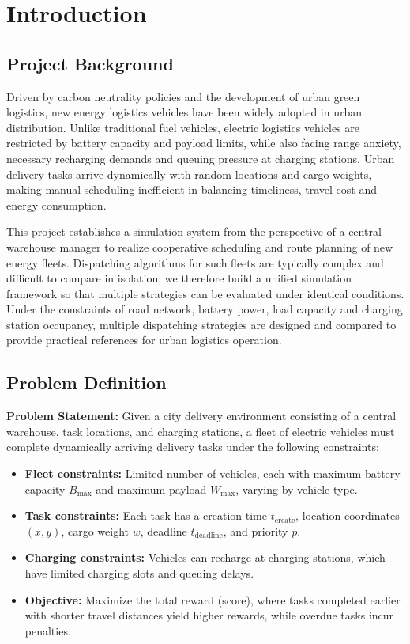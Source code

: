 
\chapter{Introduction}

\section{Project Background}

Driven by carbon neutrality policies and the development of urban green logistics, new energy logistics vehicles have been widely adopted in urban distribution. Unlike traditional fuel vehicles, electric logistics vehicles are restricted by battery capacity
and payload limits, while also facing range anxiety, necessary recharging demands and queuing pressure at charging stations. Urban delivery tasks arrive dynamically with random locations and cargo weights, making manual scheduling inefficient in balancing timeliness, travel cost and energy consumption.

This project establishes a simulation system from the perspective of a central warehouse manager to realize cooperative scheduling and route planning of new energy fleets. Dispatching algorithms for such fleets are typically complex and difficult to compare in isolation; we therefore build a unified simulation framework so that multiple strategies can be evaluated under identical conditions. Under the constraints of road network, battery power, load capacity and charging station occupancy, multiple dispatching strategies are designed and compared to provide practical references for urban logistics operation.

\section{Problem Definition}

\textbf{Problem Statement:} Given a city delivery environment consisting of a central warehouse, task locations, and charging stations, a fleet of electric vehicles must complete dynamically arriving delivery tasks under the following constraints:

\begin{itemize}[leftmargin=4em]
    \item \textbf{Fleet constraints:} Limited number of vehicles, each with maximum battery capacity $B_{\max}$ and maximum payload $W_{\max}$, varying by vehicle type.
    \item \textbf{Task constraints:} Each task has a creation time $t_{\text{create}}$, location coordinates $(x,y)$, cargo weight $w$, deadline $t_{\text{deadline}}$, and priority $p$.
    \item \textbf{Charging constraints:} Vehicles can recharge at charging stations, which have limited charging slots and queuing delays.
    \item \textbf{Objective:} Maximize the total reward (score), where tasks completed earlier with shorter travel distances yield higher rewards, while overdue tasks incur penalties.
\end{itemize}

